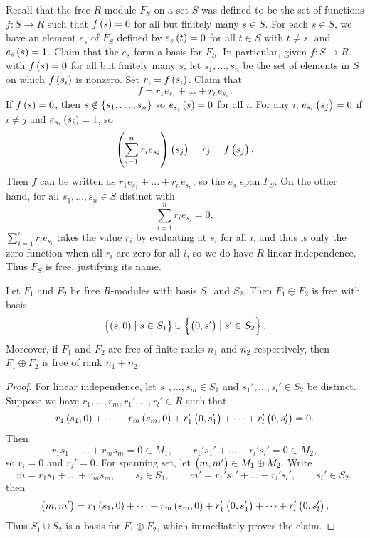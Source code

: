 Recall that the free $ R $-module $ F_S $ on a set $ S $ was defined to be the set of functions $ f : S \to R $ such that $ f\br{s} = 0 $ for all but finitely many $ s \in S $. For each $ s \in S $, we have an element $ e_s $ of $ F_S $ defined by $ e_s\br{t} = 0 $ for all $ t \in S $ with $ t \ne s $, and $ e_s\br{s} = 1 $. Claim that the $ e_s $ form a basis for $ F_S $. In particular, given $ f : S \to R $ with $ f\br{s} = 0 $ for all but finitely many $ s $, let $ s_1, \dots, s_n $ be the set of elements in $ S $ on which $ f\br{s_i} $ is nonzero. Set $ r_i = f\br{s_i} $. Claim that
$$ f = r_1e_{s_1} + \dots + r_ne_{s_n}. $$
If $ f\br{s} = 0 $, then $ s \notin \cbr{s_1, \dots, s_n} $ so $ e_{s_i}\br{s} = 0 $ for all $ i $. For any $ i $, $ e_{s_i}\br{s_j} = 0 $ if $ i \ne j $ and $ e_{s_i}\br{s_i} = 1 $, so
$$ \br{\sum_{i = 1}^n r_ie_{s_i}}\br{s_j} = r_j = f\br{s_j}. $$
Then $ f $ can be written as $ r_1e_{s_1} + \dots + r_ne_{s_n} $, so the $ e_s $ span $ F_S $. On the other hand, for all $ s_1, \dots, s_n \in S $ distinct with
$$ \sum_{i = 1}^n r_ie_{s_i} = 0, $$
$ \sum_{i = 1}^n r_ie_{s_i} $ takes the value $ r_i $ by evaluating at $ s_i $ for all $ i $, and thus is only the zero function when all $ r_i $ are zero for all $ i $, so we do have $ R $-linear independence. Thus $ F_S $ is free, justifying its name.

\begin{proposition}
Let $ F_1 $ and $ F_2 $ be free $ R $-modules with basis $ S_1 $ and $ S_2 $. Then $ F_1 \oplus F_2 $ is free with basis
$$ \cbr{\br{s, 0} \mid s \in S_1} \cup \cbr{\br{0, s'} \mid s' \in S_2}. $$ Moreover, if $ F_1 $ and $ F_2 $ are free of finite ranks $ n_1 $ and $ n_2 $ respectively, then $ F_1 \oplus F_2 $ is free of rank $ n_1 + n_2 $.
\end{proposition}

\begin{proof}
For linear independence, let $ s_1, \dots, s_m \in S_1 $ and $ s_1', \dots, s_l' \in S_2 $ be distinct. Suppose we have $ r_1, \dots, r_m, r_1', \dots, r_l' \in R $ such that
$$ r_1\br{s_1, 0} + \dots + r_m\br{s_m, 0} + r_1'\br{0, s_1'} + \dots + r_l'\br{0, s_l'} = 0. $$
Then
$$ r_1s_1 + \dots + r_ms_m = 0 \in M_1, \qquad r_1's_1' + \dots + r_l's_l' = 0 \in M_2, $$
so $ r_i = 0 $ and $ r_i' = 0 $. For spanning set, let $ \br{m, m'} \in M_1 \oplus M_2 $. Write
$$ m = r_1s_1 + \dots + r_ms_m, \qquad s_i \in S_1, \qquad m' = r_1's_1' + \dots + r_l's_l', \qquad s_i' \in S_2, $$
then
$$ \br{m, m'} = r_1\br{s_1, 0} + \dots + r_m\br{s_m, 0} + r_1'\br{0, s_1'} + \dots + r_l'\br{0, s_l'}. $$
Thus $ S_1 \cup S_2 $ is a basis for $ F_1 \oplus F_2 $, which immediately proves the claim.
\end{proof}

